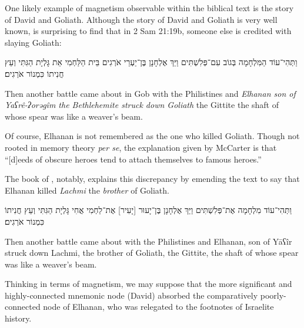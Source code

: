 One likely example of magnetism observable within the biblical text is the story of David and Goliath. Although the story of David and Goliath is very well known, is surprising to find that in 2 Sam 21:19b, someone else is credited with slaying Goliath:
\begin{hebrewtext}
    וַתְּהִי־עוֹד הַמִּלְחָמָה בְּגוֹב עִם־פְּלִשְׁתִּים וַיַּךְ אֶלְחָנָן בֶּן־יַעְרֵי אֹרְגִים בֵּית הַלַּחְמִי אֵת גָּלְיָת הַגִּתִּי וְעֵץ חֲנִיתוֹ כִּמְנוֹר אֹרְגִים׃
\end{hebrewtext}
\begin{translation}
    Then another battle came about in Gob with the Philistines and \emph{Elhanan son of Yaʕrê-ʔorəgîm the Bethlehemite struck down Goliath} the Gittite the shaft of whose spear was like a weaver's beam.
\end{translation}
\noindent
Of course, Elhanan is not remembered as the one who killed Goliath. Though not rooted in memory theory \emph{per se}, the explanation given by McCarter is that ``[d]eeds of obscure heroes tend to attach themselves to famous heroes.''\autocite[450]{mccarter1984}

The book of \chroncicles, notably, explains this discrepancy by emending the text to say that Elhanan killed \emph{Lachmi} the \emph{brother} of Goliath.
\begin{hebrewtext}
    וַתְּהִי־עוֹד מִלְחָמָה אֶת־פְּלִשְׁתִּים וַיַּךְ אֶלְחָנָן בֶּן־יָעוּר [יָעִיר] אֶת־לַחְמִי אֲחִי גָּלְיָת הַגִּתִּי וְעֵץ חֲנִיתוֹ כִּמְנוֹר אֹרְגִים׃ 
\end{hebrewtext}
\begin{translation}
    Then another battle came about with the Philistines and Elhanan, son of Yāʕîr struck down Lachmi, the brother of Goliath, the Gittite, the shaft of whose spear was like a weaver's beam.
\end{translation}
\noindent
Thinking in terms of magnetism, we may suppose that the more significant and highly-connected mnemonic node (David) absorbed the comparatively poorly-connected node of Elhanan, who was relegated to the footnotes of Israelite history. 


